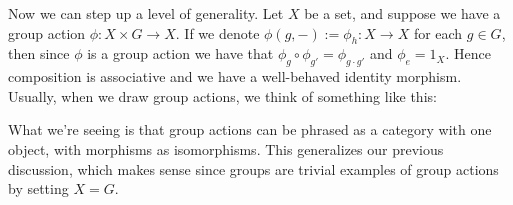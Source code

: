 \begin{example}
        Now we can step up a level of generality. Let $X$ be a set, and 
        suppose we have a group action $\phi: X \times G \to X$. If we denote 
        $\phi(g, -):= \phi_h: X \to X$ for each $g \in G$, then since $\phi$ 
        is a group action we have that $\phi_g \circ \phi_{g'} = \phi_{g\cdot g'}$ 
        and $\phi_e = 1_X$. Hence composition is associative and we have a well-behaved
        identity morphism. Usually, when we draw group actions, we think of something 
        like this: 
        \begin{center}
        \end{center}
        What we're seeing is that group actions can be phrased as a category with one object, 
        with morphisms as isomorphisms. This generalizes our previous discussion, which makes 
        sense since groups are trivial examples of group actions by setting $X = G$. 
    \end{example}



